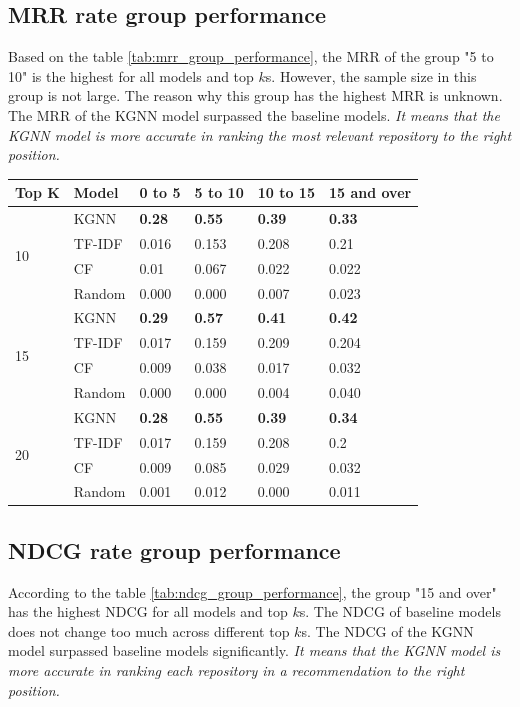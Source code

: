 \documentclass[11pt,twoside]{report}
\begin{document}
\subsection{MRR rate group performance}
Based on the table \ref{tab:mrr_group_performance}, the MRR of the group "5 to 10" is the highest for all models and top $k$s. However, the sample size in this group is not large. The reason why this group has the highest MRR is unknown. The MRR of the KGNN model surpassed the baseline models. \textit{It means that the KGNN model is more accurate in ranking the most relevant repository to the right position.}

\begin{center}
    \begin{tabular}{l | l | l | l | l | l}
    \hline
    Top K & Model & 0 to 5 & 5 to 10 & 10 to 15 & 15 and over \\
    \hline
    \multirow{4}{*}{10} 
    & KGNN & \textbf{0.28} & \textbf{0.55} & \textbf{0.39} & \textbf{0.33} \\
    & TF-IDF & 0.016 & 0.153 & 0.208 & 0.21 \\
    & CF & 0.01 & 0.067 & 0.022 & 0.022 \\
    & Random & 0.000 & 0.000 & 0.007 & 0.023 \\
    \hline
    \multirow{4}{*}{15}
    & KGNN & \textbf{0.29} & \textbf{0.57} & \textbf{0.41} & \textbf{0.42} \\
    & TF-IDF & 0.017 & 0.159 & 0.209 & 0.204 \\
    & CF & 0.009 & 0.038 & 0.017 & 0.032 \\
    & Random & 0.000 & 0.000 & 0.004 & 0.040 \\
    \hline
    \multirow{4}{*}{20}
    & KGNN & \textbf{0.28} & \textbf{0.55} & \textbf{0.39} & \textbf{0.34} \\
    & TF-IDF & 0.017 & 0.159 & 0.208 & 0.2 \\
    & CF & 0.009 & 0.085 & 0.029 & 0.032 \\
    & Random & 0.001 & 0.012 & 0.000 & 0.011 \\
    \end{tabular}
    \label{tab:mrr_group_performance}
\end{center}

\subsection{NDCG rate group performance}
According to the table \ref{tab:ndcg_group_performance}, the group "15 and over" has the highest NDCG for all models and top $k$s. The NDCG of baseline models does not change too much across different top $k$s. The NDCG of the KGNN model surpassed baseline models significantly. \textit{It means that the KGNN model is more accurate in ranking each repository in a recommendation to the right position.}
\end{document}
